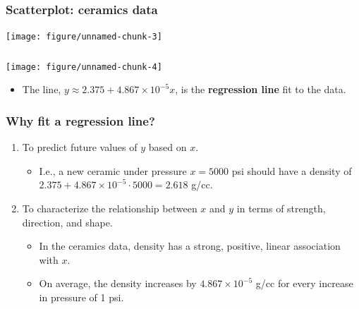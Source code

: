 \documentclass[handout]{beamer}\usepackage{graphicx, color}
\newenvironment{knitrout}{}{} %
\numberwithin{equation}{section}
\begin{document}
\begin{frame}[fragile]
\frametitle{\small Scatterplot: ceramics data}

\begin{center}
\begin{knitrout}
\color{fgcolor}
\texttt{[image: figure/unnamed-chunk-3]} 

\end{knitrout}

\end{center}
\end{frame}


\begin{frame}[fragile]
\frametitle{}
\begin{center}
\begin{knitrout}
\color{fgcolor}
\texttt{[image: figure/unnamed-chunk-4]} 

\end{knitrout}

\end{center}

\begin{itemize}
\item The line,  $y \approx 2.375 + 4.867 \times 10^{-5} x$, is the {\bf regression line} fit to the data.
\end{itemize}
\end{frame}

\begin{frame}
\frametitle{Why fit a regression line?}
\begin{enumerate}[1. ]
\item To predict future values of $y$ based on $x$.
\begin{itemize}
\pause \item I.e., a new ceramic under pressure $x = 5000$ psi should have a density of $2.375 + 4.867 \times 10^{-5} \cdot 5000 = 2.618$ g/cc. 
\end{itemize}
\pause \item To characterize the relationship between $x$ and $y$ in terms of strength, direction, and shape.
\begin{itemize}
\pause \item In the ceramics data, density has a strong, positive, linear association with $x$. 
\pause \item On average, the density increases by $4.867 \times 10^{-5}$ g/cc for every increase in pressure of 1 psi.
\end{itemize}
\end{enumerate}
\end{frame}
\end{document}

